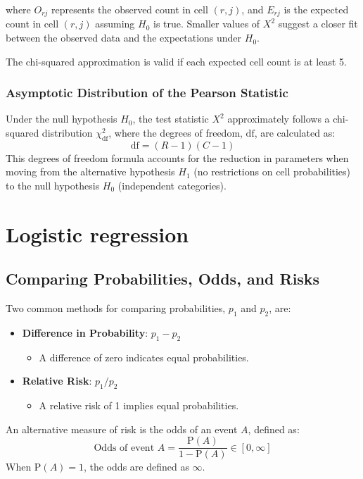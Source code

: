 \documentclass{article}
\begin{document}
where $O_{r j}$ represents the observed count in cell $(r, j)$, and $E_{r j}$ is the expected count in cell $(r, j)$ assuming $H_0$ is true. Smaller values of $X^2$ suggest a closer fit between the observed data and the expectations under $H_0$.

The chi-squared approximation is valid if each expected cell count is at least 5.

\subsubsection{Asymptotic Distribution of the Pearson Statistic}
Under the null hypothesis $H_0$, the test statistic $X^2$ approximately follows a chi-squared distribution $\chi_{\mathrm{df}}^2$, where the degrees of freedom, $\mathrm{df}$, are calculated as:
\[
\mathrm{df} = (R-1)(C-1)
\]
This degrees of freedom formula accounts for the reduction in parameters when moving from the alternative hypothesis $H_1$ (no restrictions on cell probabilities) to the null hypothesis $H_0$ (independent categories).

\section{Logistic regression}

\subsection{Comparing Probabilities, Odds, and Risks}

Two common methods for comparing probabilities, $p_{1}$ and $p_{2}$, are:

\begin{itemize}
  \item \textbf{Difference in Probability}: $p_{1}-p_{2}$
  \begin{itemize}
    \item A difference of zero indicates equal probabilities.
  \end{itemize}
  
  \item \textbf{Relative Risk}: $p_{1} / p_{2}$
  \begin{itemize}
    \item A relative risk of 1 implies equal probabilities.
  \end{itemize}
\end{itemize}

An alternative measure of risk is the odds of an event $A$, defined as:
$$
\text{Odds of event } A = \frac{\mathrm{P}(A)}{1 - \mathrm{P}(A)} \in [0, \infty]
$$
When $\mathrm{P}(A) = 1$, the odds are defined as $\infty$. 
\end{document}
